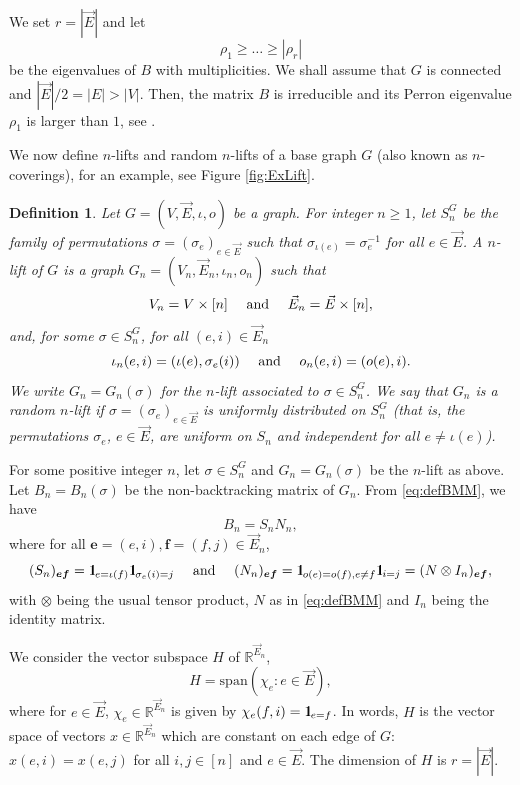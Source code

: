 \documentclass[11pt]{article}
\newtheorem{definition}[lemma]{Definition}
\newcommand{\dR}{\mathbb {R}}
\newcommand{\SPAN}{ \mathrm{span}}
\newcommand{\BRA}[1]{{{\left\{#1\right\}}}}
\newcommand{\1}{1\!\!{\sf I}}\newcommand{\IND}{\1}
\newcommand{\Be}{\bm{e}}
\newcommand{\Bf}{\bm{f}}
\begin{document}
We set $r = |\vec E| $  and let  
\begin{equation*}\label{eq:eigBX}
\rho_1 \geq  \dots \geq |\rho_r|
\end{equation*}
be the eigenvalues of $B$ with multiplicities. We shall assume that $G$ is connected and $|\vec E | / 2 = |E| > |V|$. Then, the matrix $B$ is irreducible and its Perron eigenvalue $\rho_1$ is larger than $1$, see \cite{FrKo}.


We now define $n$-lifts and random $n$-lifts of a base graph $G$ (also known as $n$-coverings), for an example, see Figure \ref{fig:ExLift}.

\begin{definition}
Let $G= (V,\vec E,\iota,o)$ be a graph. For integer $n \geq 1$, let  $S_n^{G}$ be the family of permutations $\sigma = (\sigma_e)_{e \in \vec E}$ such that $\sigma_{\iota(e)} = \sigma^{-1}_{e}$ for all $e \in \vec E$. A {\em $n$-lift of $G$} is  a graph $G_n = (V_n, \vec E_n, \iota_n,o_n)$ such that
$$V_n = V \times [n] \quad  \hbox{ and } \quad \vec E_n  = \vec E \times [n],$$
and, for some $\sigma \in S_n^G$, for all $(e,i) \in \vec E_n$
$$
\iota_n (e,i) = (\iota(e),\sigma_e(i))  \quad \hbox{ and } \quad o_n(e,i) = (o(e),i).
$$
We write $G_n = G_n(\sigma)$ for the $n$-lift associated to $\sigma \in S_n^G$.  We say that $G_n$ is a {\em random $n$-lift} if $\sigma  = (\sigma_e)_{e \in \vec E}$ is uniformly distributed on $S_n^{G}$ (that is, the permutations $\sigma_e$, $e \in \vec E$, are uniform on $S_n$ and independent for all $e \ne \iota(e)$).
\end{definition}

For some positive integer $n$, let $\sigma \in S_n^{G}$ and $G_n = G_n (\sigma)$ be the $n$-lift as above. Let $B_n = B_n(\sigma)$ be the non-backtracking matrix of $G_n$.  From \eqref{eq:defBMM}, we have 
\begin{equation}\label{eq:defBMMn}
B_n = S_n N_n,
\end{equation}
where for all $\Be = (e,i) , \Bf = (f,j) \in \vec E_n$, $$(S_n)_{\Be \Bf} =  \IND_{e = \iota(f) } \IND_{  \sigma_e (i) = j}\quad \hbox{ and } \quad (N_n)_{\Be \Bf} =  \IND_{  o(e) = o(f) , e \ne  f} \IND_{ i = j} = (N \otimes I_n)_{\Be\Bf},$$ with $\otimes$ being the usual tensor product, $N$ as in \eqref{eq:defBMM} and $I_n$ being the identity matrix.


We consider the vector subspace $H$ of $\dR^{\vec E_n}$, 
\begin{equation}\label{eq:defH}
H = \SPAN ( \chi_e : e \in \vec E) ,
\end{equation} 
where for $e \in \vec E$, $\chi_e \in \dR^{\vec E_n}$ is given by $\chi_e  ( f, i)  = \IND_{ e = f}$. In words, $H$ is the vector space of vectors $x \in \dR^{\vec E_n}$ which are constant on each edge of $G$: $x(e,i) = x(e,j)$ for all $i,j\in [n]$ and $e \in \vec E$. The dimension of $H$ is $r = | \vec E|$. 
\end{document}
